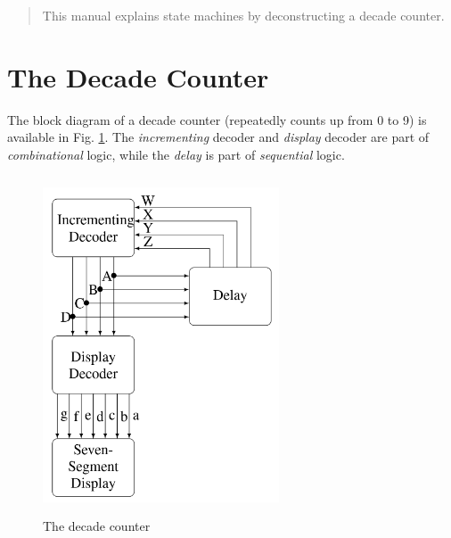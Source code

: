 \documentclass[journal,12pt,twocolumn]{IEEEtran}
\begin{document}
\tableofcontents

\bigskip

\renewcommand{\thefigure}{\theenumi}
\renewcommand{\thetable}{\theenumi}


\begin{abstract}
This manual explains state machines by deconstructing a decade counter.
\end{abstract}

\section{The Decade Counter}
The block diagram of a decade counter (repeatedly counts up from 0 to 9)
is available in Fig. \ref{fig:dec_counter}.  The {\em incrementing } decoder
and {\em display} decoder are part of {\em combinational} logic, while
the {\em delay} is part of {\em sequential} logic.
\begin{figure}[!h]
	\begin{center}
	\includegraphics[width=7cm,height=10cm]{./decade}
\end{center}
\caption{The decade counter}
\label{fig:dec_counter}
\end{figure}
%
\end{document}

